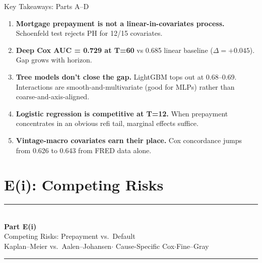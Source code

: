 \documentclass[10pt,aspectratio=169]{beamer}
\begin{document}
\begin{frame}{Key Takeaways: Parts A--D}

    \begin{enumerate}\itemsep4pt

        \item \textbf{Mortgage prepayment is not a linear-in-covariates process.}
              Schoenfeld test rejects PH for 12/15 covariates.

        \item \textbf{Deep Cox AUC = 0.729 at T=60} vs 0.685 linear baseline ($\Delta = +0.045$). Gap grows with horizon.

        \item \textbf{Tree models don't close the gap.} LightGBM tops out at 0.68--0.69. Interactions are smooth-and-multivariate (good for MLPs) rather than coarse-and-axis-aligned.

        \item \textbf{Logistic regression is competitive at T=12.} When prepayment concentrates in an obvious refi tail, marginal effects suffice.

        \item \textbf{Vintage-macro covariates earn their place.} Cox concordance jumps from 0.626 to 0.643 from FRED data alone.

    \end{enumerate}

\end{frame}

\section{E(i): Competing Risks}

\begin{frame}
    \vfill
    \begin{center}
        {\color{accent}\rule{0.28\linewidth}{1.2pt}}\\[0.7em]
        {\Large\bfseries Part E(i)}\\[0.5em]
        {\large Competing Risks: Prepayment vs.\ Default}\\[0.4em]
        {\small Kaplan--Meier vs.\ Aalen--Johansen\enspace$\cdot$\enspace
                Cause-Specific Cox\enspace$\cdot$\enspace Fine--Gray}\\[0.7em]
        {\color{accent}\rule{0.28\linewidth}{1.2pt}}
    \end{center}
    \vfill
\end{frame}
\end{document}
